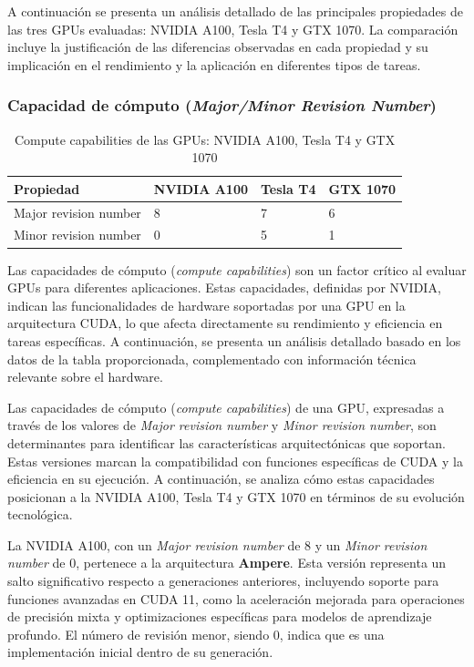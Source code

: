 \documentclass{article}
\begin{document}
		A continuación se presenta un análisis detallado de las principales propiedades de las tres GPUs evaluadas: NVIDIA A100, Tesla T4 y GTX 1070. La comparación incluye la justificación de las diferencias observadas en cada propiedad y su implicación en el rendimiento y la aplicación en diferentes tipos de tareas.

		\subsubsection{Capacidad de cómputo (\textit{Major/Minor Revision Number})}

			\begin{table}[H]
				\begin{adjustbox}{width=\textwidth, keepaspectratio}
					\begin{tabular}{|l|l|l|l|}
						\hline
						\textbf{Propiedad} & \textbf{NVIDIA A100} & \textbf{Tesla T4} & \textbf{GTX 1070} \\ \hline
						Major revision number & 8 & 7 & 6 \\ \hline
						Minor revision number & 0 & 5 & 1 \\ \hline
					\end{tabular}
				\end{adjustbox}
				\centering
				\caption{Compute capabilities de las GPUs: NVIDIA A100, Tesla T4 y GTX 1070}
			\end{table}

			Las capacidades de cómputo (\textit{compute capabilities}) son un factor crítico al evaluar GPUs para diferentes aplicaciones. Estas capacidades, definidas por NVIDIA, indican las funcionalidades de hardware soportadas por una GPU en la arquitectura CUDA, lo que afecta directamente su rendimiento y eficiencia en tareas específicas. A continuación, se presenta un análisis detallado basado en los datos de la tabla proporcionada, complementado con información técnica relevante sobre el hardware.

			Las capacidades de cómputo (\textit{compute capabilities}) de una GPU, expresadas a través de los valores de \textit{Major revision number} y \textit{Minor revision number}, son determinantes para identificar las características arquitectónicas que soportan. Estas versiones marcan la compatibilidad con funciones específicas de CUDA y la eficiencia en su ejecución. A continuación, se analiza cómo estas capacidades posicionan a la NVIDIA A100, Tesla T4 y GTX 1070 en términos de su evolución tecnológica.

			La NVIDIA A100, con un \textit{Major revision number} de 8 y un \textit{Minor revision number} de 0, pertenece a la arquitectura \textbf{Ampere}. Esta versión representa un salto significativo respecto a generaciones anteriores, incluyendo soporte para funciones avanzadas en CUDA 11, como la aceleración mejorada para operaciones de precisión mixta y optimizaciones específicas para modelos de aprendizaje profundo. El número de revisión menor, siendo 0, indica que es una implementación inicial dentro de su generación.
\end{document}
